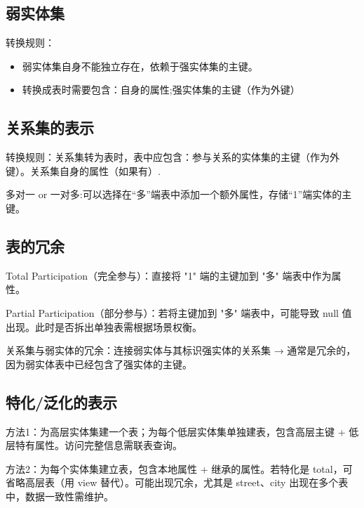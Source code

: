 \subsection{弱实体集}

转换规则：
\begin{itemize}
    \item 弱实体集自身不能独立存在，依赖于强实体集的主键。
    \item 转换成表时需要包含：自身的属性;强实体集的主键（作为外键）
\end{itemize}

\subsection{关系集的表示}

转换规则：关系集转为表时，表中应包含：参与关系的实体集的主键（作为外键）。关系集自身的属性（如果有）.

多对一 or 一对多:可以选择在“多”端表中添加一个额外属性，存储“1”端实体的主键。

\subsection{表的冗余}

Total Participation（完全参与）：直接将 "1" 端的主键加到 "多" 端表中作为属性。

Partial Participation（部分参与）：若将主键加到 "多" 端表中，可能导致 null 值 出现。此时是否拆出单独表需根据场景权衡。

关系集与弱实体的冗余：连接弱实体与其标识强实体的关系集 → 通常是冗余的，因为弱实体表中已经包含了强实体的主键。

\subsection{特化/泛化的表示}

方法1：为高层实体集建一个表；为每个低层实体集单独建表，包含高层主键 + 低层特有属性。访问完整信息需联表查询。



方法2：为每个实体集建立表，包含本地属性 + 继承的属性。若特化是 total，可省略高层表（用 view 替代）。可能出现冗余，尤其是 street、city 出现在多个表中，数据一致性需维护。